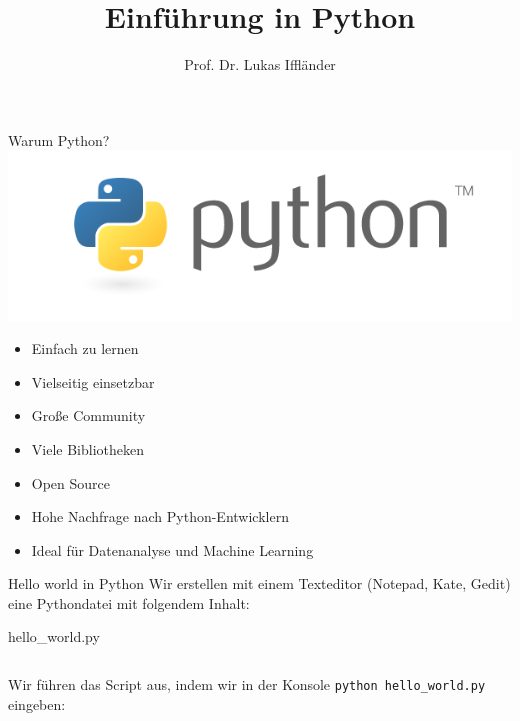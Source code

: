 \documentclass[xelatex,aspectratio=169]{beamer}
\title{Einführung in Python}
\author{Prof. Dr. Lukas Iffländer}
\institute{HTW Dresden}
\date{}
\begin{document}
\begin{frame}
  \titlepage
\end{frame}


\begin{frame}{Warum Python?}
  \includegraphics[width=.3\linewidth]{img/python_logo.png}
  \begin{itemize}
    \item Einfach zu lernen
    \item Vielseitig einsetzbar
    \item Große Community
    \item Viele Bibliotheken
    \item Open Source
    \item Hohe Nachfrage nach Python-Entwicklern
    \item Ideal für Datenanalyse und Machine Learning
  \end{itemize}
\end{frame}

\begin{frame}{Hello world in Python}
  Wir erstellen mit einem Texteditor (Notepad, Kate, Gedit) eine Pythondatei mit folgendem Inhalt:

  \begin{listing}
    \caption{hello\_world.py}
    \inputminted{python}{src/hello_world.py}
  \end{listing}

  Wir führen das Script aus, indem wir in der Konsole \texttt{python hello\_world.py} eingeben:




\end{frame}
\end{document}

